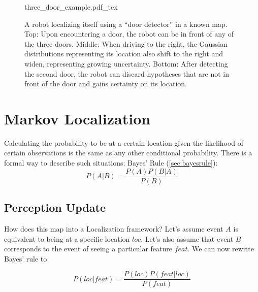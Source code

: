 \begin{figure}
	\centering
    \def\svgwidth{\textwidth}
    {three_door_example.pdf_tex}
	\caption{A robot localizing itself using a ``door detector'' in a known map. Top: Upon encountering a door, the robot can be in front of any of the three doors. Middle: When driving to the right, the Gaussian distributions representing its location also shift to the right and widen, representing growing uncertainty. Bottom: After detecting the second door, the robot can discard hypotheses that are not in front of the door and gains certainty on its location. 
	\label{fig:three_door_example}}
\end{figure}

\section{Markov Localization}\label{sec:markovloc}
Calculating the probability to be at a certain location given the likelihood of certain observations is the same as any other conditional probability. There is a formal way to describe such situations: Bayes' Rule (\cref{sec:bayesrule}):
\begin{equation}
P(A|B)=\frac{P(A)P(B|A)}{P(B)}
\end{equation}

\subsection{Perception Update}
How does this map into a Localization framework? Let's assume event $A$ is equivalent to being at a specific location $loc$. Let's also assume that event $B$ corresponds to the event of seeing a particular feature $feat$. We can now rewrite Bayes' rule to

\begin{equation}
P(loc|feat)=\frac{P(loc)P(feat|loc)}{P(feat)}
\label{eq:bayesloc}
\end{equation}

